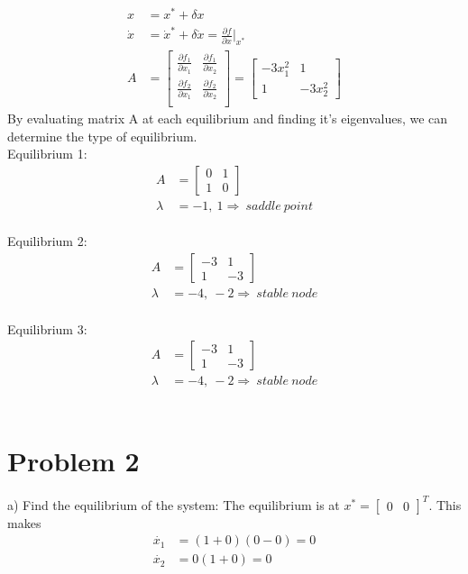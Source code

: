 \documentclass[paper=a4, fontsize=11pt]{scrartcl} %
\numberwithin{equation}{section} %
\numberwithin{figure}{section} %
\numberwithin{table}{section} %
\begin{document}
\subsection{}
\begin{align*}
x &= x^* + \delta x \\
\dot{x} &= \dot{x}^* + \delta \dot{x} = \frac{\partial f}{\partial x}\Bigr|_{x^*} \\
A &= \begin{bmatrix}
\frac{\partial f_1}{\partial x_1} & \frac{\partial f_1}{\partial x_2} \\ 
\frac{\partial f_2}{\partial x_1} & \frac{\partial f_2}{\partial x_2} \\ 
\end{bmatrix}
= \begin{bmatrix}
-3x_1^2 & 1 \\ 
1 & -3x_2^2 
\end{bmatrix}
\end{align*}
By evaluating matrix A at each equilibrium and finding it's eigenvalues, we can determine the type of equilibrium.\\
Equilibrium 1: 
\begin{align}
A &= \begin{bmatrix}
0 & 1\\ 
1 & 0  
\end{bmatrix}\\
\lambda &= -1,\ 1 \Rightarrow\ saddle\ point
\end{align} \\
Equilibrium 2: 
\begin{align}
A &= \begin{bmatrix}
-3 & 1\\ 
1 & -3  
\end{bmatrix}\\
\lambda &= -4,\ -2 \Rightarrow\ stable\ node
\end{align} \\
Equilibrium 3: 
\begin{align}
A &= \begin{bmatrix}
-3 & 1\\ 
1 & -3  
\end{bmatrix}\\
\lambda &= -4,\ -2 \Rightarrow\ stable\ node
\end{align} \\

\newpage

\section{Problem 2}
a) Find the equilibrium of the system:
The equilibrium is at $x^* = \begin{bmatrix}0 & 0\end{bmatrix}^T$. This makes 
\begin{align*}
\dot{x_1} &=(1+0)(0-0) = 0\\
\dot{x_2} &= 0(1+0) = 0
\end{align*}
\end{document}
